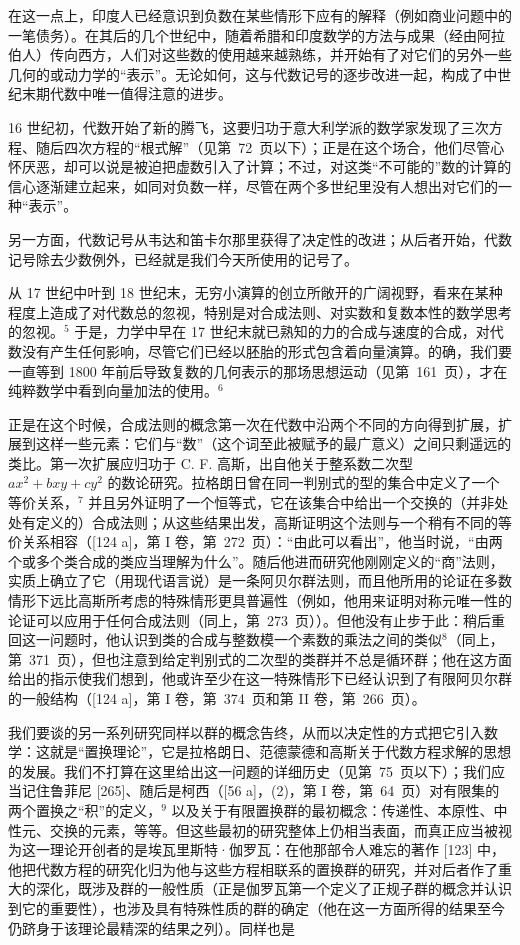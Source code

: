 在这一点上，印度人已经意识到负数在某些情形下应有的解释（例如商业问题中的一笔债务）。在其后的几个世纪中，随着希腊和印度数学的方法与成果（经由阿拉伯人）传向西方，人们对这些数的使用越来越熟练，并开始有了对它们的另外一些几何的或动力学的“表示”。无论如何，这与代数记号的逐步改进一起，构成了中世纪末期代数中唯一值得注意的进步。

16 世纪初，代数开始了新的腾飞，这要归功于意大利学派的数学家发现了三次方程、随后四次方程的“根式解”（见第~72~页以下）；正是在这个场合，他们尽管心怀厌恶，却可以说是被迫把虚数引入了计算；不过，对这类“不可能的”数的计算的信心逐渐建立起来，如同对负数一样，尽管在两个多世纪里没有人想出对它们的一种“表示”。

另一方面，代数记号从韦达和笛卡尔那里获得了决定性的改进；从后者开始，代数记号除去少数例外，已经就是我们今天所使用的记号了。

从 17 世纪中叶到 18 世纪末，无穷小演算的创立所敞开的广阔视野，看来在某种程度上造成了对代数总的忽视，特别是对合成法则、对实数和复数本性的数学思考的忽视。\(^{5}\) 于是，力学中早在 17 世纪末就已熟知的力的合成与速度的合成，对代数没有产生任何影响，尽管它们已经以胚胎的形式包含着向量演算。的确，我们要一直等到 1800 年前后导致复数的几何表示的那场思想运动（见第~161~页），才在纯粹数学中看到向量加法的使用。\(^{6}\)

正是在这个时候，合成法则的概念第一次在代数中沿两个不同的方向得到扩展，扩展到这样一些元素：它们与“数”（这个词至此被赋予的最广意义）之间只剩遥远的类比。第一次扩展应归功于 C. F. 高斯，出自他关于整系数二次型 \(ax^{2} + bxy + cy^{2}\) 的数论研究。拉格朗日曾在同一判别式的型的集合中定义了一个等价关系，\(^{7}\) 并且另外证明了一个恒等式，它在该集合中给出一个交换的（并非处处有定义的）合成法则；从这些结果出发，高斯证明这个法则与一个稍有不同的等价关系相容（{[}124 a{]}，第 I 卷，第~272~页）：“由此可以看出”，他当时说，“由两个或多个类合成的类应当理解为什么”。随后他进而研究他刚刚定义的“商”法则，实质上确立了它（用现代语言说）是一条阿贝尔群法则，而且他所用的论证在多数情形下远比高斯所考虑的特殊情形更具普遍性（例如，他用来证明对称元唯一性的论证可以应用于任何合成法则（同上，第~273~页））。但他没有止步于此：稍后重回这一问题时，他认识到类的合成与整数模一个素数的乘法之间的类似\(^{8}\)（同上，第~371~页），但也注意到给定判别式的二次型的类群并不总是循环群；他在这方面给出的指示使我们想到，他或许至少在这一特殊情形下已经认识到了有限阿贝尔群的一般结构（{[}124 a{]}，第 I 卷，第~374~页和第 II 卷，第~266~页）。

我们要谈的另一系列研究同样以群的概念告终，从而以决定性的方式把它引入数学：这就是“置换理论”，它是拉格朗日、范德蒙德和高斯关于代数方程求解的思想的发展。我们不打算在这里给出这一问题的详细历史（见第~75~页以下）；我们应当记住鲁菲尼 {[}265{]}、随后是柯西（{[}56 a{]}，(2)，第 I 卷，第~64~页）对有限集的两个置换之“积”的定义，\(^{9}\) 以及关于有限置换群的最初概念：传递性、本原性、中性元、交换的元素，等等。但这些最初的研究整体上仍相当表面，而真正应当被视为这一理论开创者的是埃瓦里斯特·伽罗瓦：在他那部令人难忘的著作 {[}123{]} 中，他把代数方程的研究化归为他与这些方程相联系的置换群的研究，并对后者作了重大的深化，既涉及群的一般性质（正是伽罗瓦第一个定义了正规子群的概念并认识到它的重要性），也涉及具有特殊性质的群的确定（他在这一方面所得的结果至今仍跻身于该理论最精深的结果之列）。同样也是

